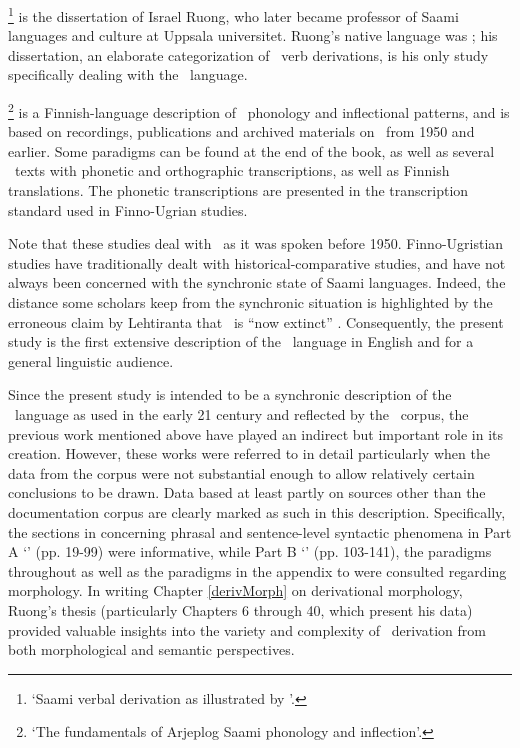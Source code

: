 \footnote{‘Saami verbal derivation as illustrated by \PS’.} \citep{Ruong1943} is the dissertation of Israel Ruong, who later became professor of Saami languages and culture at Uppsala universitet. Ruong’s native language was \PS; his dissertation, an elaborate categorization of \PS\ verb derivations, is his only study specifically dealing with the \PS\ language. %

\footnote{‘The fundamentals of Arjeplog Saami phonology and inflection’.} \citep{Lehtiranta1992} is a Fin\-nish-language description of \PS\ phonology and inflectional patterns, and is based on recordings, publications and archived materials on \PS\ from 1950 and earlier. Some paradigms can be found at the end of the book, as well as several \PS\ texts with phonetic and orthographic transcriptions, as well as Finnish translations. The phonetic transcriptions are presented in the transcription standard used in Finno-Ugrian studies. 

Note that these studies deal with \PS\ as it was spoken before 1950. Finno-Ugristian studies have traditionally dealt with historical-comparative studies, and have not always been concerned with the synchronic state of Saami languages. Indeed, the distance some scholars keep from the synchronic situation is highlighted by the erroneous claim by Lehtiranta %
that \PS\ is “now extinct” \citep[English abstract]{Lehtiranta1992}. 
Consequently, the present study is the first extensive description of the \PS\ language in English and for a general linguistic audience. %

Since the present study is intended to be a synchronic description of the \PS\ language as used in the early 21 century and reflected by the \PSDP\ corpus, the previous work mentioned above have played an indirect but important role in its creation. However, these works were referred to in detail particularly when the data from the corpus were not substantial enough to allow relatively certain conclusions to be drawn. Data based at least partly on sources other than the documentation corpus are clearly marked as such in this description. Specifically, the sections in \mbox{\citet{Lagercrantz1926}} concerning phrasal and sentence-level syntactic phenomena in Part A ‘’ (pp. 19-99) were informative, while Part B ‘’ (pp. 103-141), the paradigms throughout \citet{Halasz1896} as well as the paradigms in the appendix to \citet[150-166]{Lehtiranta1992} were consulted regarding morphology. In writing Chapter \ref{derivMorph} on derivational morphology, Ruong’s thesis  (particularly Chapters 6 through 40, which present his data) provided valuable insights into the variety and complexity of \PS\ derivation from both morphological and semantic perspectives. %

